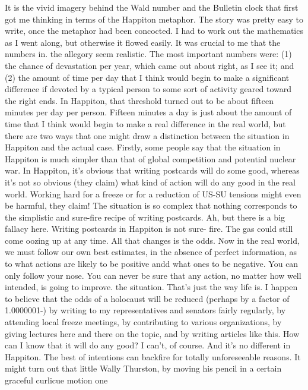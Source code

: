         It is the vivid imagery behind the Wald number and the Bulletin clock that
first got me thinking in terms of the Happiton metaphor. The story was pretty easy to
write, once the metaphor had been concocted. I had to work out the mathematics as I
went along, but otherwise it flowed easily. It was crucial to me that the numbers in.
the allegory seem realistic. The most important numbers were: (1) the chance of
devastation per year, which came out about right, as I see it; and (2) the amount of
time per day that I think would begin to make a significant difference if devoted by a
typical person to some sort of activity geared toward the right ends. In Happiton, that
threshold turned out to be about fifteen minutes per day per person. Fifteen minutes a
day is just about the amount of time that I think would begin to make a real difference
in the real world, but there are two ways that one might draw a distinction between
the situation in Happiton and the actual case.
        Firstly, some people say that the situation in Happiton is much simpler than
that of global competition and potential nuclear war. In Happiton, it's obvious that
writing postcards will do some good, whereas it's not so obvious (they claim) what
kind of action will do any good in the real world. Working hard for a freeze or for a
reduction of US-SU tensions might even be harmful, they claim! The situation is so
complex that nothing corresponds to the simplistic and sure-fire recipe of writing
postcards.
        Ah, but there is a big fallacy here. Writing postcards in Happiton is not sure-
fire. The gas could still come oozing up at any time. All that changes is the odds. Now
in the real world, we must follow our own best estimates, in the absence of perfect
information, as to what actions are likely to be positive andd what ones to be negative.
You can only follow your nose. You can never be sure that any action, no matter how
well intended, is going to improve. the situation. That's just the way life is.
        I happen to believe that the odds of a holocaust will be reduced (perhaps by a
factor of 1.0000001-) by writing to my representatives and senators fairly regularly,
by attending local freeze meetings, by contributing to various organizations, by giving
lectures here and there on the topic, and by writing articles like this. How can I know
that it will do any good? I can't, of course. And it's no different in Happiton. The best
of intentions can backfire for totally unforeseeable reasons. It might turn out that little
Wally Thurston, by moving his pencil in a certain graceful curlicue motion one




